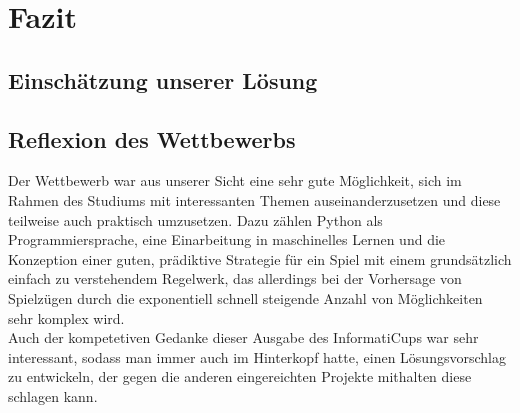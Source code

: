 \chapter{Fazit}
\label{ch:fazit}

\section{Einschätzung unserer Lösung}
\label{sec:einschaetzuung}

\section{Reflexion des Wettbewerbs}
\label{sec:reflexion}

Der Wettbewerb war aus unserer Sicht eine sehr gute Möglichkeit, sich im Rahmen des Studiums mit interessanten Themen
auseinanderzusetzen und diese teilweise auch praktisch umzusetzen.
Dazu zählen \ua Python als Programmiersprache, eine Einarbeitung in maschinelles Lernen und die Konzeption einer
guten, prädiktive Strategie für ein Spiel mit einem grundsätzlich einfach zu verstehendem Regelwerk, das allerdings
bei der Vorhersage von Spielzügen durch die exponentiell schnell steigende Anzahl von Möglichkeiten sehr komplex wird.
\\

Auch der kompetetiven Gedanke dieser Ausgabe des InformatiCups war sehr interessant, sodass man immer auch im
Hinterkopf hatte, einen Lösungsvorschlag zu entwickeln, der gegen die anderen eingereichten Projekte mithalten \bzw
diese schlagen kann.